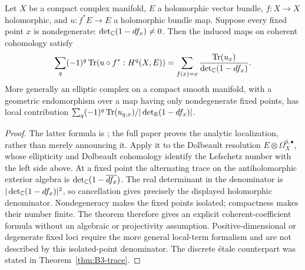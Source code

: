 \begin{theorem}\label{thm:B3-holomorphic-lefschetz}
Let $X$ be a compact complex manifold, $E$ a holomorphic vector
bundle, $f:X\to X$ holomorphic, and $u:f^*E\to E$ a holomorphic
bundle map. Suppose every fixed point $x$ is nondegenerate:
$\det_{\mathbb{C}}(1-df_x)\ne0$. Then the induced maps on coherent cohomology
satisfy
\[
 \sum_q(-1)^q\operatorname{Tr}(u\circ f^*:H^q(X,E))
 =\sum_{f(x)=x}\frac{\operatorname{Tr}(u_x)}
                         {\det_{\mathbb{C}}(1-df_x)}.
\]
More generally an elliptic complex on a compact smooth manifold,
with a geometric endomorphism over a map having only nondegenerate
fixed points, has local contribution
$\sum_q(-1)^q\operatorname{Tr}(u_{q,x})/
 |\det_{\mathbb{R}}(1-df_x)|$.
\end{theorem}
\begin{proof}
The latter formula is \cite[Theorem A, pp.~377--378]{BAtiyahBott1967};
the full paper proves the analytic localization, rather than merely
announcing it. Apply it to the Dolbeault resolution
$E\otimes\Omega_X^{0,\bullet}$, whose ellipticity and Dolbeault
cohomology identify the Lefschetz number with the left side above.
At a fixed point the alternating trace on the antiholomorphic
exterior algebra is $\det_{\mathbb{C}}(1-\overline{df_x})$. The real determinant
in the denominator is
$|\det_{\mathbb{C}}(1-df_x)|^2$, so cancellation gives precisely the displayed
holomorphic denominator. Nondegeneracy makes the fixed points
isolated; compactness makes their number finite. The theorem therefore
gives an explicit coherent-coefficient formula without an algebraic
or projectivity assumption. Positive-dimensional or degenerate
fixed loci require the more general local-term formalism and are
not described by this isolated-point denominator. The discrete
\'etale counterpart was stated in Theorem~\ref{thm:B3-trace}.
\end{proof}

